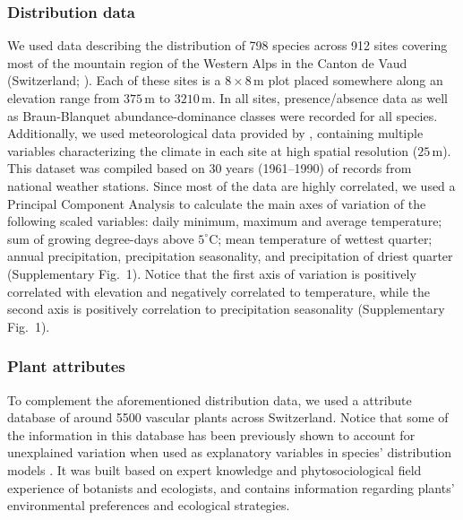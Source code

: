 \documentclass[11pt, a4paper]{article}
\begin{document}
\subsubsection*{Distribution data}
We used data describing the distribution of 798 species across 912 sites covering most of the mountain region of the Western Alps in the Canton de Vaud (Switzerland; \citealt{scherrerEcologicalIndicatorValues2019}). Each of these sites is a $8\times 8\,\text{m}$ plot placed somewhere along an elevation range from $375\,\text{m}$ to $3210\,\text{m}$. In all sites, presence/absence data as well as Braun-Blanquet abundance-dominance classes were recorded for all species. Additionally, we used meteorological data provided by \citet{scherrerEcologicalIndicatorValues2019}, containing multiple variables characterizing the climate in each site at high spatial resolution ($25\,\text{m}$). This dataset was compiled based on 30 years (1961–1990) of records from national weather stations. Since most of the data are highly correlated, we used a Principal Component Analysis to calculate the main axes of variation of the following scaled variables: daily minimum, maximum and average temperature; sum of growing degree-days above $5^{\circ}\text{C}$; mean temperature of wettest quarter; annual precipitation, precipitation seasonality, and precipitation of driest quarter (Supplementary Fig.~1). Notice that the first axis of variation is positively correlated with elevation and negatively correlated to temperature, while the second axis is positively correlation to precipitation seasonality (Supplementary Fig.~1). %

\subsubsection*{Plant attributes}
To complement the aforementioned distribution data, we used a attribute database of around 5500 vascular plants across Switzerland. Notice that some of the information in this database has been previously shown to account for unexplained variation when used as explanatory variables in species' distribution models \citep{scherrerEcologicalIndicatorValues2019}.  It was built based on expert knowledge and phytosociological field experience of botanists and ecologists, and contains information regarding plants' environmental preferences and ecological strategies. 
\end{document}
